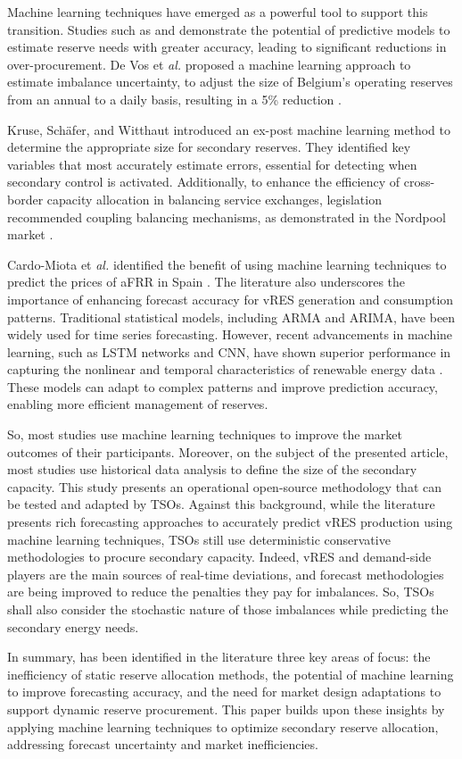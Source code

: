 Machine learning techniques have emerged as a powerful tool to support this transition. Studies such as \cite{DeVos2019} and \cite{Kruse2022} demonstrate the potential of predictive models to estimate reserve needs with greater accuracy, leading to significant reductions in over-procurement. 
De Vos et \textit{al.} proposed a machine learning approach to estimate imbalance uncertainty, to adjust the size of Belgium's operating reserves from an annual to a daily basis, resulting in a 5\% reduction \cite{DeVos2019}. 

Kruse, Sch\"{a}fer, and Witthaut introduced an ex-post machine learning method to determine the appropriate size for secondary reserves. They identified key variables that most accurately estimate errors, essential for detecting when secondary control is activated. Additionally, to enhance the efficiency of cross-border capacity allocation in balancing service exchanges, legislation recommended coupling balancing mechanisms, as demonstrated in the Nordpool market \cite{Frade:19c,Khodadadi:20}.\par
Cardo-Miota et \textit{al.} identified the benefit of using machine learning techniques to predict the prices of \gls{aFRR} in Spain \cite{Cardo-Miota:23}.
The literature also underscores the importance of enhancing forecast accuracy for \gls{vRES} generation and consumption patterns. Traditional statistical models, including ARMA and ARIMA, have been widely used for time series forecasting. However, recent advancements in machine learning, such as \gls{LSTM} networks and \gls{CNN}, have shown superior performance in capturing the nonlinear and temporal characteristics of renewable energy data \cite{Couto:21,Benti2023}. These models can adapt to complex patterns and improve prediction accuracy, enabling more efficient management of reserves.\par

{So, most studies use machine learning techniques to improve the market outcomes of their participants. Moreover, on the subject of the presented article, most studies use historical data analysis to define the size of the secondary capacity. This study presents an operational open-source methodology that can be tested and adapted by \gls{TSO}s. 
Against this background, while the literature presents rich forecasting approaches to accurately predict \gls{vRES} production using machine learning techniques, \gls{TSO}s still use deterministic conservative methodologies to procure secondary capacity. Indeed, vRES and demand-side players are the main sources of real-time deviations, and forecast methodologies are being improved to reduce the penalties they pay for imbalances. So, \gls{TSO}s shall also consider the stochastic nature of those imbalances while predicting the secondary energy needs.}

In summary, has been identified in the literature three key areas of focus: the inefficiency of static reserve allocation methods, the potential of machine learning to improve forecasting accuracy, and the need for market design adaptations to support dynamic reserve procurement. This paper builds upon these insights by applying machine learning techniques to optimize secondary reserve allocation, addressing forecast uncertainty and market inefficiencies.\par